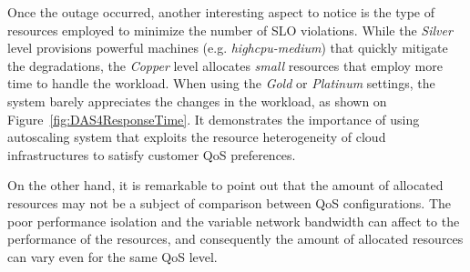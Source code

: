 Once the outage occurred, another interesting aspect to notice is the type of resources employed to minimize the number of SLO violations. While the \emph{Silver} level provisions powerful machines (e.g. \emph{highcpu-medium}) that quickly mitigate the degradations, the \emph{Copper} level allocates \emph{small} resources that employ more time to handle the workload. When using the \emph{Gold} or \emph{Platinum} settings, the system barely appreciates the changes in the workload, as shown on Figure~\ref{fig:DAS4ResponseTime}. It demonstrates the importance of using autoscaling system that exploits the resource heterogeneity of cloud infrastructures to satisfy customer QoS preferences.


On the other hand, it is remarkable to point out that the amount of allocated resources may not be a subject of comparison between QoS configurations. The poor performance isolation and the variable network bandwidth can affect to the performance of the resources, and consequently the amount of allocated resources can vary even for the same QoS level.



\setcounter{figure}{7}

